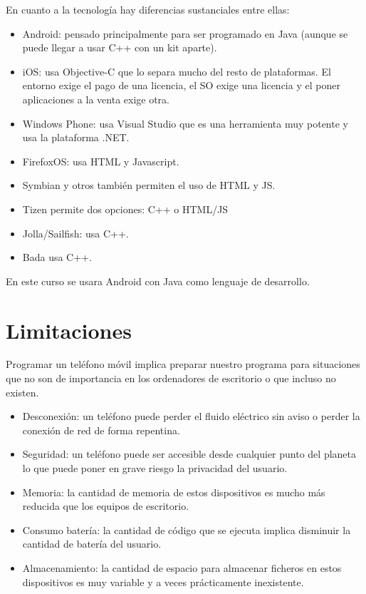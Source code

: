 \documentclass[a4paper,12pt,spanish]{sphinxmanual}
\begin{document}
En cuanto a la tecnología hay diferencias sustanciales entre ellas:
\begin{itemize}
\item {} 
Android: pensado principalmente para ser programado en Java (aunque se puede llegar a usar C++ con un kit aparte).

\item {} 
iOS: usa Objective-C que lo separa mucho del resto de plataformas. El entorno exige el pago de una licencia, el SO exige una licencia y el poner aplicaciones a la venta exige otra.

\item {} 
Windows Phone: usa Visual Studio que es una herramienta muy potente y usa la plataforma .NET.

\item {} 
FirefoxOS: usa HTML y Javascript.

\item {} 
Symbian y otros también permiten el uso de HTML y JS.

\item {} 
Tizen permite dos opciones: C++ o HTML/JS

\item {} 
Jolla/Sailfish: usa C++.

\item {} 
Bada usa C++.

\end{itemize}

En este curso se usara Android con Java como lenguaje de desarrollo.


\section{Limitaciones}
\label{tema1:limitaciones}
Programar un teléfono móvil implica preparar nuestro programa para situaciones que no son de importancia en los ordenadores de escritorio o que incluso no existen.
\begin{itemize}
\item {} 
Desconexión: un teléfono puede perder el fluido eléctrico sin aviso o perder la conexión de red de forma repentina.

\item {} 
Seguridad: un teléfono puede ser accesible desde cualquier punto del planeta lo que puede poner en grave riesgo la privacidad del usuario.

\item {} 
Memoria: la cantidad de memoria de estos dispositivos es mucho más reducida que los equipos de escritorio.

\item {} 
Consumo batería: la cantidad de código que se ejecuta implica disminuir la cantidad de batería del usuario.

\item {} 
Almacenamiento: la cantidad de espacio para almacenar ficheros en estos dispositivos es muy variable y a veces prácticamente inexistente.

\end{itemize}
\end{document}
